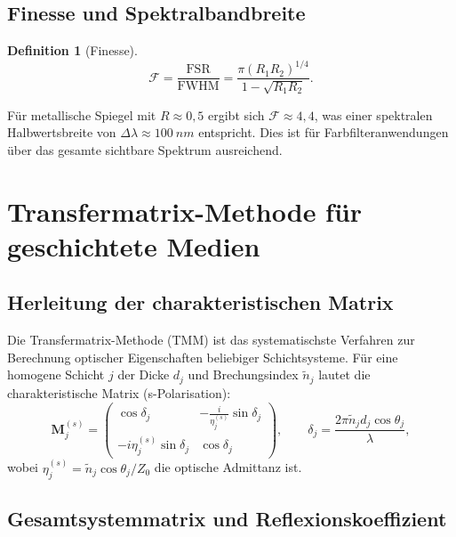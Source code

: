 ﻿\documentclass[a4paper,12pt]{scrreprt}
\theoremstyle{definition}
\newtheorem{definition}{Definition}[section]
\newcommand{\matr}[1]{\mathbf{#1}}
\begin{document}
\subsection{Finesse und Spektralbandbreite}

\begin{definition}[Finesse]
  \begin{equation}
    \mathcal{F} = \frac{\mathrm{FSR}}{\mathrm{FWHM}} = \frac{\pi (R_1 R_2)^{1/4}}{1 - \sqrt{R_1 R_2}}.
  \end{equation}
\end{definition}

Für metallische Spiegel mit $R \approx 0{,}5$ ergibt sich $\mathcal{F} \approx 4{,}4$,
was einer spektralen Halbwertsbreite von $\Delta\lambda \approx \SI{100}{nm}$ entspricht.
Dies ist für Farbfilteranwendungen über das gesamte sichtbare Spektrum ausreichend.

\section{Transfermatrix-Methode für geschichtete Medien}

\subsection{Herleitung der charakteristischen Matrix}

Die Transfermatrix-Methode (TMM) ist das systematischste Verfahren zur
Berechnung optischer Eigenschaften beliebiger Schichtsysteme. Für eine
homogene Schicht $j$ der Dicke $d_j$ und Brechungsindex $\tilde{n}_j$ lautet
die charakteristische Matrix (s-Polarisation):
\begin{equation}
  \matr{M}_j^{(s)} = \begin{pmatrix}
    \cos\delta_j & -\tfrac{i}{\eta_j^{(s)}} \sin\delta_j \\
    -i\eta_j^{(s)} \sin\delta_j & \cos\delta_j
  \end{pmatrix},
  \qquad \delta_j = \frac{2\pi \tilde{n}_j d_j \cos\theta_j}{\lambda},
\end{equation}
wobei $\eta_j^{(s)} = \tilde{n}_j \cos\theta_j / Z_0$ die optische Admittanz ist.

\subsection{Gesamtsystemmatrix und Reflexionskoeffizient}
\end{document}
